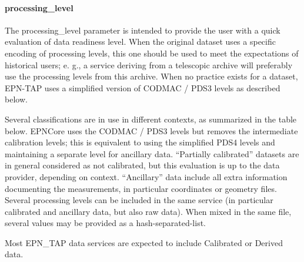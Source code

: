 \documentclass[11pt,a4paper]{ivoa}
\begin{document}
\paragraph{processing\_level}

The processing\_level parameter is intended to provide the user with a quick evaluation of data readiness level. When the original dataset uses a specific encoding of processing levels, this one should be used to meet the expectations of historical users; e. g., a service deriving from a telescopic archive will preferably use the processing levels from this archive. When no practice exists for a dataset, EPN-TAP uses a simplified version of CODMAC / PDS3 levels as described below.

Several classifications are in use in different contexts, as summarized in the table below.  EPNCore uses the CODMAC / PDS3 levels but removes the intermediate calibration levels; this is equivalent to using the simplified PDS4 levels and maintaining a separate level for ancillary data. ``Partially calibrated'' datasets are in general considered as not calibrated, but this evaluation is up to the data provider, depending on context. ``Ancillary'' data include all extra information documenting the measurements, in particular coordinates or geometry files. Several processing levels can be included in the same service (in particular calibrated and ancillary data, but also raw data). When mixed in the same file, several values may be provided as a hash-separated-list.

Most EPN\_TAP data services are expected to include Calibrated or Derived data. 
\end{document}
